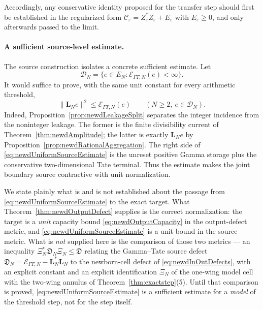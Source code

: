 \documentclass[11pt]{amsart}
\theoremstyle{definition}
\theoremstyle{remark}
\begin{document}
Accordingly, any conservative identity proposed for the transfer step should
first be established in the regularized form
\(\mathcal C_\varepsilon=Z_\varepsilon^*Z_\varepsilon+E_\varepsilon\) with
\(E_\varepsilon\ge0\), and only afterwards passed to the limit.

\paragraph{A sufficient source-level estimate.}
The source construction isolates a concrete sufficient estimate.  Let
\[
 \mathscr D_N=
 \{e\in E_N:\mathcal E_{\Gamma T,N}(e)<\infty\}.
\]
It would suffice to prove, with the same unit constant for every arithmetic
threshold,
\begin{equation}\label{eq:newdUniformSourceEstimate}
 \|\mathbf L_Ne\|^2\leq\mathcal E_{\Gamma T,N}(e)
 \qquad(N\geq2,\ e\in\mathscr D_N).
\end{equation}
Indeed, Proposition~\ref{prop:newdLeakageSplit} separates the integer
incidence from the noninteger leakage.  The former is the finite
divisibility current of Theorem~\ref{thm:newdAmplitude}; the latter is
exactly $\mathbf L_Ne$ by
Proposition~\ref{prop:newdRationalAggregation}.  The right side of
\eqref{eq:newdUniformSourceEstimate} is the unreset positive Gamma storage
plus the conservative two-dimensional Tate terminal.  Thus the estimate makes
the joint boundary source contractive with unit normalization.

We state plainly what is and is not established about the passage from
\eqref{eq:newdUniformSourceEstimate} to the exact target.  What
Theorem~\ref{thm:newdOutputDefect} supplies is the correct normalization: the
target is a \emph{unit} capacity bound \eqref{eq:newdOutputCapacity} in the
output-defect metric, and \eqref{eq:newdUniformSourceEstimate} is a unit bound
in the source metric.  What is \emph{not} supplied here is the comparison of
those two metrics --- an inequality
\(\Xi_N^*\mathfrak D_N\Xi_N\le\mathfrak D\) relating the Gamma--Tate source
defect \(\mathfrak D_N=\mathcal E_{\Gamma T,N}-\mathbf L_N^*\mathbf L_N\) to
the newborn-cell defect of \eqref{eq:newdInOutDefects}, with an explicit
constant and an explicit identification \(\Xi_N\) of the one-wing model cell
with the two-wing annulus of Theorem~\ref{thm:exactstep}(5).  Until that
comparison is proved, \eqref{eq:newdUniformSourceEstimate} is a sufficient
estimate for a \emph{model} of the threshold step, not for the step itself.
\end{document}
